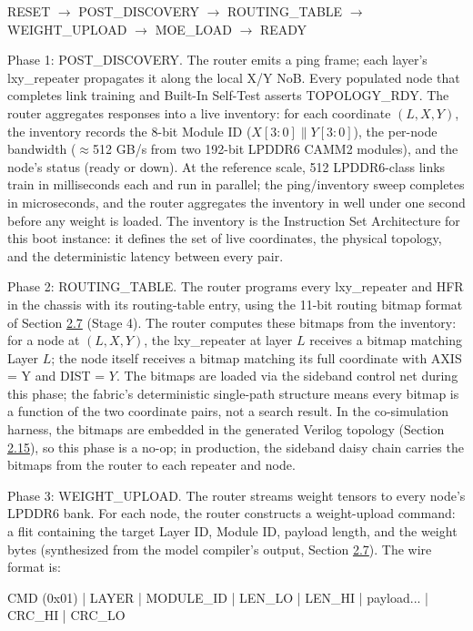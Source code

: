 \documentclass[12pt,onecolumn]{article}
\begin{document}
RESET $\rightarrow$ POST\_DISCOVERY $\rightarrow$ ROUTING\_TABLE $\rightarrow$ WEIGHT\_UPLOAD $\rightarrow$ MOE\_LOAD $\rightarrow$ READY

Phase 1: POST\_DISCOVERY. The router emits a ping frame; each layer's lxy\_repeater propagates it along the local X/Y NoB. Every populated node that completes link training and Built-In Self-Test asserts TOPOLOGY\_RDY. The router aggregates responses into a live inventory: for each coordinate $(L, X, Y)$, the inventory records the 8-bit Module ID ($X[3:0] \parallel Y[3:0]$), the per-node bandwidth ($\approx$512 GB/s from two 192-bit LPDDR6 CAMM2 modules), and the node's status (ready or down). At the reference scale, 512 LPDDR6-class links train in milliseconds each and run in parallel; the ping/inventory sweep completes in microseconds, and the router aggregates the inventory in well under one second before any weight is loaded. The inventory is the Instruction Set Architecture for this boot instance: it defines the set of live coordinates, the physical topology, and the deterministic latency between every pair.

Phase 2: ROUTING\_TABLE. The router programs every lxy\_repeater and HFR in the chassis with its routing-table entry, using the 11-bit routing bitmap format of Section \hyperref[sec:2.7]{2.7} (Stage 4). The router computes these bitmaps from the inventory: for a node at $(L, X, Y)$, the lxy\_repeater at layer $L$ receives a bitmap matching Layer $L$; the node itself receives a bitmap matching its full coordinate with AXIS = Y and DIST = $Y$. The bitmaps are loaded via the sideband control net during this phase; the fabric's deterministic single-path structure means every bitmap is a function of the two coordinate pairs, not a search result. In the co-simulation harness, the bitmaps are embedded in the generated Verilog topology (Section \hyperref[sec:2.15]{2.15}), so this phase is a no-op; in production, the sideband daisy chain carries the bitmaps from the router to each repeater and node.

Phase 3: WEIGHT\_UPLOAD. The router streams weight tensors to every node's LPDDR6 bank. For each node, the router constructs a weight-upload command: a flit containing the target Layer ID, Module ID, payload length, and the weight bytes (synthesized from the model compiler's output, Section \hyperref[sec:2.7]{2.7}). The wire format is:

CMD (0x01) | LAYER | MODULE\_ID | LEN\_LO | LEN\_HI | payload... | CRC\_HI | CRC\_LO
\end{document}
